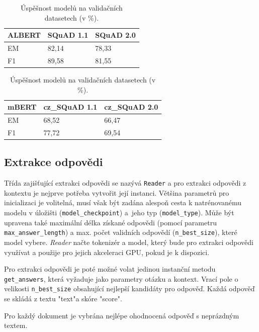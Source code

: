 \begin{table}[h]
\centering
    \begin{tabular}{| l | l | l |}
        \hline
        \textbf{ALBERT} & SQuAD 1.1 & SQuAD 2.0 \\ \hline
        EM              & 82,14      & 78,33      \\ \hline
        F1              & 89,58      & 81,55      \\ \hline
    \end{tabular}
    \begin{tabular}{| l | l | l |}
        \hline
        \textbf{mBERT} & cz\_SQuAD 1.1 & cz\_SQuAD 2.0 \\ \hline
        EM              & 68,52      & 66,47      \\ \hline
        F1              & 77,72      & 69,54      \\ \hline
    \end{tabular}
    \caption{
    Úspěšnost modelů na validačních datasetech (v \%).
    }
    \label{tab:reader_trained}
\end{table}

\subsection{Extrakce odpovědi}
Třída zajišťující extrakci odpovědi se nazývá \texttt{Reader} a pro extrakci odpovědi z kontextu je nejprve potřeba vytvořit její instanci. Většina parametrů pro inicializaci je volitelná, musí však být zadána alespoň cesta k natrénovanému modelu v úložišti (\texttt{model\_checkpoint}) a~jeho typ (\texttt{model\_type}). Může být upravena také maximální délka získané odpovědi (pomocí parametru\texttt{ max\_answer\_length}) a max. počet validních odpovědí (\texttt{n\_best\_size}), které model vybere. \emph{Reader} načte tokenizér a model, který bude pro extrakci odpovědi využívat a použije pro jejich akceleraci GPU, pokud je k dispozici.\par
Pro extrakci odpovědi je poté možné volat jedinou instanční metodu \texttt{get\_answers}, která vyžaduje jako parametry otázku a kontext. Vrací pole o velikosti \texttt{n\_best\_size} obsahující nejlepší kandidáty pro odpověď. Každá odpověď se skládá z textu "text"\;a skóre "score".\par
Pro každý dokument je vybrána nejlépe ohodnocená odpověď s neprázdným textem.

